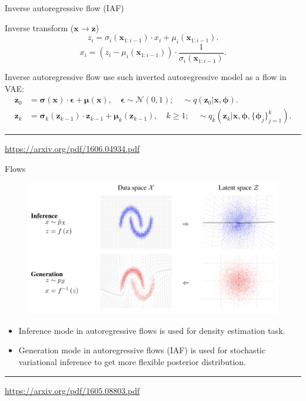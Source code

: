 \documentclass{beamer}
\newcommand{\bx}{\mathbf{x}}
\newcommand{\bz}{\mathbf{z}}
\newcommand{\bepsilon}{\boldsymbol{\epsilon}}
\newcommand{\bmu}{\boldsymbol{\mu}}
\newcommand{\bsigma}{\boldsymbol{\sigma}}
\newcommand{\bphi}{\boldsymbol{\phi}}
\begin{document}
\begin{frame}{Inverse autoregressive flow (IAF)}
	
	\begin{block}{Inverse transform ($\bx \rightarrow \bz$)}
		\vspace{-0.2cm}
		\[
			z_i = \sigma_i (\bx_{1:i-1}) \cdot x_i + \mu_i(\bx_{1:i-1}).
		\]
		\[
			x_i = \left( z_i - \mu_i(\bx_{1:i-1})\right) \cdot \frac{1}{\sigma_i (\bx_{1:i-1})}.
		\]
		\vspace{-0.3cm}
	\end{block}
	Inverse autoregressive flow use such inverted autoregressive model as a flow in VAE:
	\begin{align*}
		\bz_0 &= \bsigma(\bx) \cdot \bepsilon + \bmu(\bx), \quad \bepsilon \sim \mathcal{N}(0, 1); \quad  \sim q(\bz_0 | \bx, \bphi). \\
		\bz_k &= \bsigma_k(\bz_{k - 1}) \cdot \bz_{k-1} + \bmu_k(\bz_{k - 1}), \quad k \geq 1; \quad  \sim q_k(\bz_k | \bx, \bphi, \{\bphi_j\}_{j=1}^k).
	\end{align*}
	\vfill
	\hrule\medskip
	{\scriptsize \href{https://arxiv.org/pdf/1606.04934.pdf}{https://arxiv.org/pdf/1606.04934.pdf}} 
\end{frame}
\begin{frame}{Flows}
\begin{figure}
	\includegraphics[width=0.8\linewidth]{figs/flows_how2.png}
\end{figure}
\begin{itemize}	
	\item Inference mode in autoregressive flows is used for density estimation task.
	\item Generation mode in autoregressive flows (IAF) is used for stochastic variational inference to get more flexible posterior distribution.
\end{itemize}
\vfill
\hrule\medskip
{\scriptsize \href{https://arxiv.org/pdf/1605.08803.pdf}{https://arxiv.org/pdf/1605.08803.pdf}} 
\end{frame}
\end{document}
